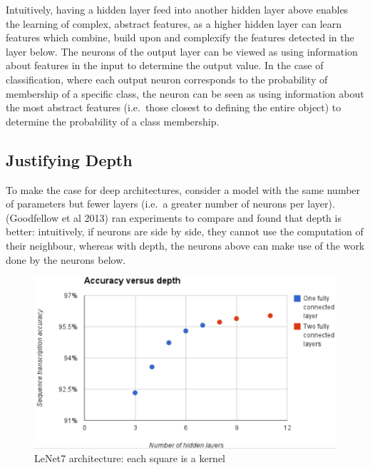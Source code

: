 \documentclass[a4paper,11pt]{article}
\begin{document}
Intuitively, having a hidden layer feed into another hidden layer above enables the learning of complex, abstract features, as a higher hidden layer can learn features which combine, build upon and complexify the features detected in the layer below. The neurons of the output layer can be viewed as using information about features in the input to determine the output value. In the case of classification, where each output neuron corresponds to the probability of membership of a specific class, the neuron can be seen as using information about the most abstract features (i.e.\ those closest to defining the entire object) to determine the probability of a class membership. \\

\subsection{Justifying Depth}

To make the case for deep architectures, consider a model with the same number of parameters but fewer layers (i.e.\ a greater number of neurons per layer). (Goodfellow et al 2013) \cite{goodfellow_street_view} ran experiments to compare and found that depth is better: intuitively, if neurons are side by side, they cannot use the computation of their neighbour, whereas with depth, the neurons above can make use of the work done by the neurons below. \\	

\begin{figure}[h!]
	\centering
	\includegraphics[scale=0.3]{images/more_layers_better.png}
	\caption{LeNet7 architecture: each square is a kernel}
    \label{f13}
\end{figure}
\end{document}
